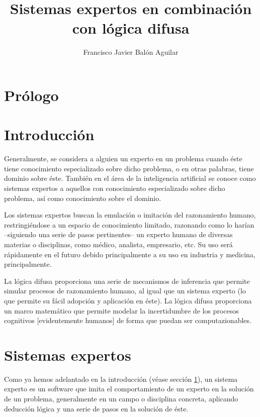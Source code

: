 \documentclass[a4paper, 11pt, titlepage]{article}
\title{Sistemas expertos en combinación con lógica difusa}
\author{Francisco Javier Balón Aguilar}
\begin{document}
\maketitle
\renewcommand{\contentsname}{Índice}
\tableofcontents
\newpage

\section*{Prólogo}

\section{Introducción}\label{introduccion}

    Generalmente, se considera a alguien un experto en un problema cuando éste tiene
    conocimiento especializado sobre dicho problema, o en otras palabras, tiene dominio 
    sobre éste.  También en el área de la inteligencia artificial se conoce como 
    sistemas expertos a aquellos con conocimiento especializado sobre dicho problema, así 
    como conocimiento sobre el dominio.

    Los sistemas expertos buscan la emulación o imitación del razonamiento humano, 
    restringiéndose a un espacio de conocimiento limitado, razonando como lo harían
    --siguiendo una serie de pasos pertinentes-- un experto humano de diversas materias 
    o disciplinas, como médico, analista, empresario, etc. Su uso será rápidamente en el 
    futuro debido principalmente a su uso en industria y medicina, principalmente.

    La lógica difusa proporciona una serie de mecanismos de inferencia que permite simular 
    procesos de razonamiento humano, al igual que un sistema experto (lo que permite su 
    fácil adopción y aplicación en éste). La lógica difusa proporciona un marco matemático 
    que permite modelar la incertidumbre de los procesos cognitivos [evidentemente humanos]
    de forma que puedan ser computazionables.

\section{Sistemas expertos}

    Como ya hemos adelantado en la introducción (véase sección \ref{introduccion}), un sistema 
    experto es un software que imita el comportamiento de un experto en la solución de un problema, 
    generalmente en un campo o disciplina concreta, aplicando deducción lógica y una serie de 
    pasos en la solución de éste.
\end{document}
